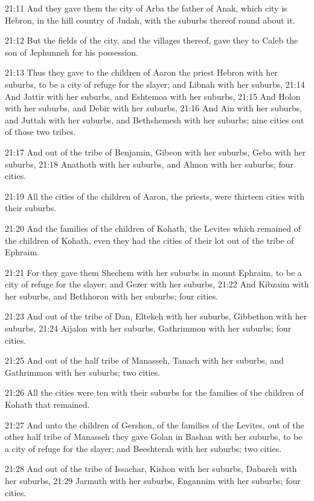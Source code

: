 21:11 And they gave them the city of Arba the father of Anak, which city is Hebron, in the hill country of Judah, with the suburbs thereof round about it.

21:12 But the fields of the city, and the villages thereof, gave they to Caleb the son of Jephunneh for his possession.

21:13 Thus they gave to the children of Aaron the priest Hebron with her suburbs, to be a city of refuge for the slayer; and Libnah with her suburbs, 21:14 And Jattir with her suburbs, and Eshtemoa with her suburbs, 21:15 And Holon with her suburbs, and Debir with her suburbs, 21:16 And Ain with her suburbs, and Juttah with her suburbs, and Bethshemesh with her suburbs; nine cities out of those two tribes.

21:17 And out of the tribe of Benjamin, Gibeon with her suburbs, Geba with her suburbs, 21:18 Anathoth with her suburbs, and Almon with her suburbs; four cities.

21:19 All the cities of the children of Aaron, the priests, were thirteen cities with their suburbs.

21:20 And the families of the children of Kohath, the Levites which remained of the children of Kohath, even they had the cities of their lot out of the tribe of Ephraim.

21:21 For they gave them Shechem with her suburbs in mount Ephraim, to be a city of refuge for the slayer; and Gezer with her suburbs, 21:22 And Kibzaim with her suburbs, and Bethhoron with her suburbs; four cities.

21:23 And out of the tribe of Dan, Eltekeh with her suburbs, Gibbethon with her suburbs, 21:24 Aijalon with her suburbs, Gathrimmon with her suburbs; four cities.

21:25 And out of the half tribe of Manasseh, Tanach with her suburbs, and Gathrimmon with her suburbs; two cities.

21:26 All the cities were ten with their suburbs for the families of the children of Kohath that remained.

21:27 And unto the children of Gershon, of the families of the Levites, out of the other half tribe of Manasseh they gave Golan in Bashan with her suburbs, to be a city of refuge for the slayer; and Beeshterah with her suburbs; two cities.

21:28 And out of the tribe of Issachar, Kishon with her suburbs, Dabareh with her suburbs, 21:29 Jarmuth with her suburbs, Engannim with her suburbs; four cities.

